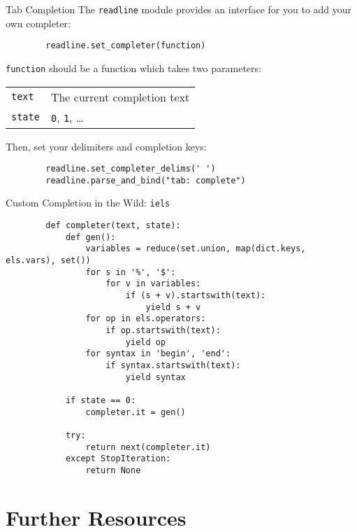 \documentclass[aspectratio=1610]{beamer}
\begin{document}
\begin{frame}[fragile]{Tab Completion}
    The \texttt{readline} module provides an interface for you to add your own
    completer:

    \begin{verbatim}
        readline.set_completer(function)
    \end{verbatim}

    \texttt{function} should be a function which takes two
    parameters:

    \begin{tabular}{l l}
        \texttt{text} & The current completion text \\
        \texttt{state} & \texttt{0}, \texttt{1}, \ldots \\
    \end{tabular}

    \pause

    Then, set your delimiters and completion keys:
    \begin{verbatim}
        readline.set_completer_delims(' ')
        readline.parse_and_bind("tab: complete")
    \end{verbatim}
\end{frame}

\begin{frame}[fragile]{Custom Completion in the Wild: \texttt{iels}}
    \fontsize{9pt}{10pt}\selectfont
    \begin{verbatim}
        def completer(text, state):
            def gen():
                variables = reduce(set.union, map(dict.keys, els.vars), set())
                for s in '%', '$':
                    for v in variables:
                        if (s + v).startswith(text):
                            yield s + v
                for op in els.operators:
                    if op.startswith(text):
                        yield op
                for syntax in 'begin', 'end':
                    if syntax.startswith(text):
                        yield syntax

            if state == 0:
                completer.it = gen()

            try:
                return next(completer.it)
            except StopIteration:
                return None
    \end{verbatim}
\end{frame}

\section{Further Resources}
\end{document}
